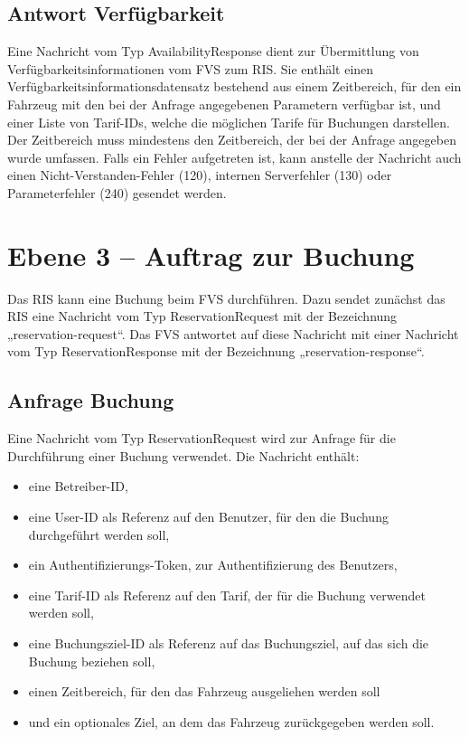 

\subsection{Antwort Verfügbarkeit}
Eine Nachricht vom Typ AvailabilityResponse dient zur Übermittlung von Verfügbarkeitsinformationen vom FVS zum RIS. Sie enthält einen Verfügbarkeitsinformationsdatensatz bestehend aus einem Zeitbereich, für den ein Fahrzeug mit den bei der Anfrage angegebenen Parametern verfügbar ist, und einer Liste von Tarif-IDs, welche die möglichen Tarife für Buchungen darstellen. Der Zeitbereich muss mindestens den Zeitbereich, der bei der Anfrage angegeben wurde umfassen. Falls ein Fehler aufgetreten ist, kann anstelle der Nachricht auch einen Nicht-Verstanden-Fehler (120), internen Serverfehler (130) oder Parameterfehler (240) gesendet werden.




\section{Ebene 3 -- Auftrag zur Buchung}
Das RIS kann eine Buchung beim FVS durchführen. Dazu sendet zunächst das RIS eine Nachricht vom Typ ReservationRequest mit der Bezeichnung „reservation-request“. Das FVS antwortet auf diese Nachricht mit einer Nachricht vom Typ ReservationResponse mit der Bezeichnung „reservation-response“.



\subsection{Anfrage Buchung}
Eine Nachricht vom Typ ReservationRequest wird zur Anfrage für die Durchführung einer Buchung verwendet. Die Nachricht enthält:
\begin{itemize}
\item eine Betreiber-ID,
\item eine User-ID als Referenz auf den Benutzer, für den die Buchung durchgeführt werden soll,
\item ein Authentifizierungs-Token, zur Authentifizierung des Benutzers,
\item eine Tarif-ID als Referenz auf den Tarif, der für die Buchung verwendet werden soll,
\item eine Buchungsziel-ID als Referenz auf das Buchungsziel, auf das sich die Buchung beziehen soll,
\item einen Zeitbereich, für den das Fahrzeug ausgeliehen werden soll
\item und ein optionales Ziel, an dem das Fahrzeug zurückgegeben werden soll.
\end{itemize}

